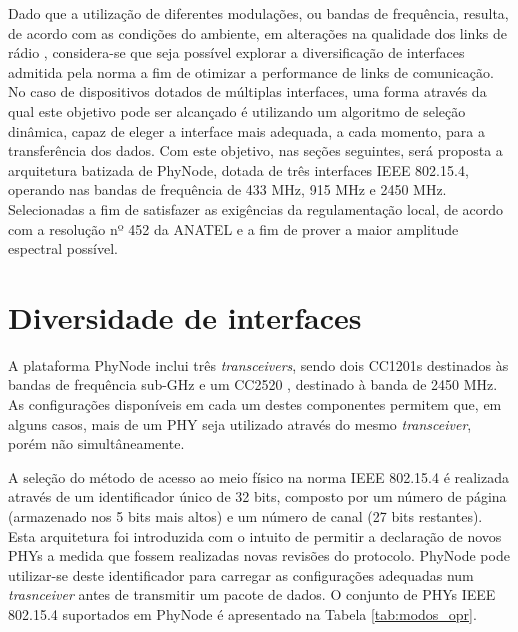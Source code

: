 \documentclass{article}
\begin{document}
	Dado que a utilização de diferentes modulações, ou bandas de frequência, resulta, de acordo com as condições do ambiente, em alterações na qualidade dos links de rádio \cite{bibid}, considera-se que seja possível explorar a diversificação de interfaces admitida pela norma a fim de otimizar a performance de links de comunicação. No caso de dispositivos dotados de múltiplas interfaces, uma forma através da qual este objetivo pode ser alcançado é utilizando um algoritmo de seleção dinâmica, capaz de eleger a interface mais adequada, a cada momento, para a transferência dos dados. Com este objetivo, nas seções seguintes, será proposta a arquitetura batizada de PhyNode, dotada de três interfaces IEEE 802.15.4, operando nas bandas de frequência de 433 MHz, 915 MHz e 2450 MHz. Selecionadas a fim de satisfazer as exigências da regulamentação local, de acordo com a resolução nº 452 da ANATEL \cite{bibid} e a fim de prover a maior amplitude espectral possível.
	
\clearpage
\section{Diversidade de interfaces}	
	A plataforma PhyNode inclui três \textit{transceivers}, sendo dois CC1201s \cite{bibid} destinados às bandas de frequência sub-GHz e um CC2520 \cite{bibid}, destinado à banda de 2450 MHz. As configurações disponíveis em cada um destes componentes permitem que, em alguns casos, mais de um PHY seja utilizado através do mesmo \textit{transceiver}, porém  não simultâneamente.
	
	A seleção do método de acesso ao meio físico na norma IEEE 802.15.4 é realizada através de um identificador único de 32 bits, composto por um número de página (armazenado nos 5 bits mais altos) e um número de canal (27 bits restantes). Esta arquitetura foi introduzida com o intuito de permitir a declaração de novos PHYs a medida que fossem realizadas novas revisões do protocolo. PhyNode pode utilizar-se deste identificador para carregar as configurações adequadas num \textit{trasnceiver} antes de transmitir um pacote de dados. O conjunto de PHYs IEEE 802.15.4 suportados em PhyNode é apresentado na Tabela \ref{tab:modos_opr}.
	
\end{document}
